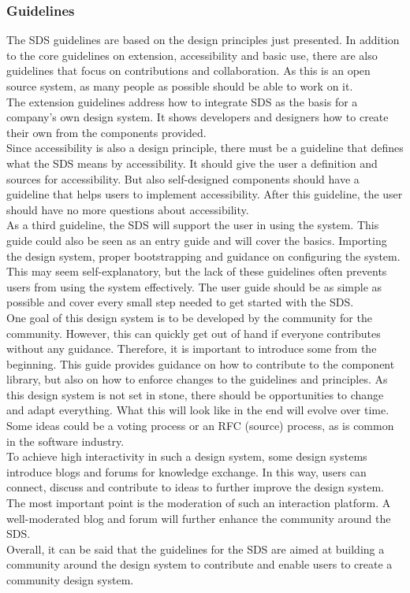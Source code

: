 \subsubsection*{Guidelines}
The \ac{SDS} guidelines are based on the design principles just presented. In addition to the core guidelines on extension, accessibility and basic use, there are also guidelines that focus on contributions and collaboration. As this is an open source system, as many people as possible should be able to work on it. \\
The extension guidelines address how to integrate \ac{SDS} as the basis for a company's own design system. It shows developers and designers how to create their own from the components provided. \\
Since accessibility is also a design principle, there must be a guideline that defines what the \ac{SDS} means by accessibility. It should give the user a definition and sources for accessibility. But also self-designed components should have a guideline that helps users to implement accessibility. After this guideline, the user should have no more questions about accessibility. \\
As a third guideline, the \ac{SDS} will support the user in using the system. This guide could also be seen as an entry guide and will cover the basics. Importing the design system, proper bootstrapping and guidance on configuring the system. This may seem self-explanatory, but the lack of these guidelines often prevents users from using the system effectively. The user guide should be as simple as possible and cover every small step needed to get started with the \ac{SDS}. \\
One goal of this design system is to be developed by the community for the community. However, this can quickly get out of hand if everyone contributes without any guidance. Therefore, it is important to introduce some from the beginning. This guide provides guidance on how to contribute to the component library, but also on how to enforce changes to the guidelines and principles. As this design system is not set in stone, there should be opportunities to change and adapt everything. What this will look like in the end will evolve over time. Some ideas could be a voting process or an RFC (source) process, as is common in the software industry. \\
To achieve high interactivity in such a design system, some design systems introduce blogs and forums for knowledge exchange. In this way, users can connect, discuss and contribute to ideas to further improve the design system. The most important point is the moderation of such an interaction platform. A well-moderated blog and forum will further enhance the community around the \ac{SDS}. \\
Overall, it can be said that the guidelines for the \ac{SDS} are aimed at building a community around the design system to contribute and enable users to create a community design system. 
